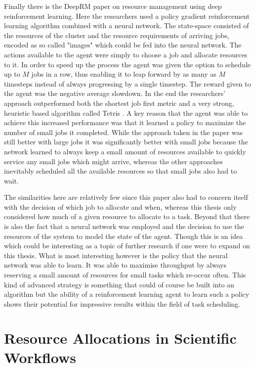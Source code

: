 Finally there is the DeepRM \cite{DeepRM} paper on resource management using deep reinforcement learning. Here the researchers used a policy gradient reinforcement learning algorithm combined with a neural network. The state-space consisted of the resources of the cluster and the resource requirements of arriving jobs, encoded as so called "images" which could be fed into the neural network. The actions available to the agent were simply to choose a job and allocate resources to it. In order to speed up the process the agent was given the option to schedule up to $M$ jobs in a row, thus enabling it to leap forward by as many as $M$ timesteps instead of always progressing by a single timestep. The reward given to the agent was the negative average slowdown. In the end the researchers' approach outperformed both the shortest job first metric and a very strong, heuristic based algorithm called Tetris \cite{tetris}. A key reason that the agent was able to achieve this increased performance was that it learned a policy to maximize the number of small jobs it completed. While the approach taken in the paper was still better with large jobs it was significantly better with small jobs because the network learned to always keep a small amount of resources available to quickly service any small jobs which might arrive, whereas the other approaches inevitably scheduled all the available resources so that small jobs also had to wait.

The similarities here are relatively few since this paper also had to concern itself with the decision of which job to allocate and when, whereas this thesis only considered how much of a given resource to allocate to a task. Beyond that there is also the fact that a neural network was employed and the decision to use the resources of the system to model the state of the agent. Though this is an idea which could be interesting as a topic of further research if one were to expand on this thesis. What is most interesting however is the policy that the neural network was able to learn. It was able to maximise throughput by always reserving a small amount of resources for small tasks which re-occur often. This kind of advanced strategy is something that could of course be built into an algorithm but the ability of a reinforcement learning agent to learn such a policy shows their potential for impressive results within the field of task scheduling.

\section{Resource Allocations in Scientific Workflows}
\label{sec:workflow_allocation_papers}

